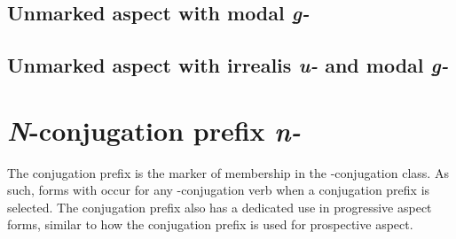 \documentclass[12pt,letterpaper,landscape,oneside,article]{memoir}
\begin{document}
\clearpage
\subsection{Unmarked aspect with modal \textit{g̱-}}

\subsection{Unmarked aspect with irrealis \textit{u-} and modal \textit{g̱-}}

\clearpage
\section{\textit{N}-conjugation prefix \textit{n-}}

\begin{multicols}{2}
The  conjugation prefix is the marker of membership in the -conjugation class.
As such, forms with  occur for any -conjugation verb when a conjugation prefix is selected.
The  conjugation prefix also has a dedicated use in progressive aspect forms, similar to how the  conjugation prefix is used for prospective aspect.
\end{multicols}
\end{document}
